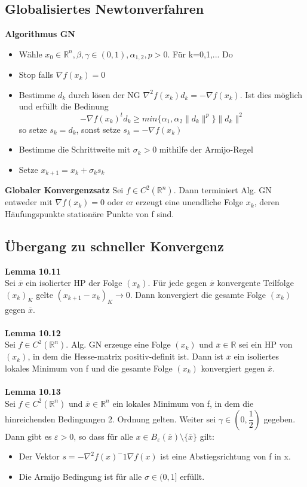 \documentclass[a4paper,10pt]{article}
\begin{document}
\subsection{Globalisiertes Newtonverfahren}
\textbf{Algorithmus GN}\\
\begin{itemize}
\item Wähle $x_0\in \mathbb{R}^n,\beta,\gamma \in (0,1), \alpha_{1,2},p>0$.  Für k=0,1,... Do
\item Stop falls $\nabla f(x_k)=0$
\item Bestimme $d_k$ durch lösen der NG $\nabla ^2f(x_k)d_k=-\nabla f(x_k)$. Ist dies möglich und erfüllt die Bedinung \begin{equation}
-\nabla f(x_k)^td_k\geq min\{\alpha_1,\alpha_2\|d_k\|^p\}\|d_k\|^2
\end{equation}
so setze $s_k=d_k$, sonst setze $s_k=-\nabla f(x_k)$
\item Bestimme die Schrittweite mit $\sigma_k>0$ mithilfe der Armijo-Regel
\item Setze $x_{k+1}=x_k+\sigma_k s_k$
\end{itemize}

\textbf{Globaler Konvergenzsatz}
Sei $f\in C^2(\mathbb{R}^n)$. Dann terminiert Alg. GN entweder mit $\nabla f(x_k)=0$ oder er erzeugt eine unendliche Folge $x_k$, deren Häufungspunkte stationäre Punkte von f sind.

\subsection{Übergang zu schneller Konvergenz}
\textbf{Lemma 10.11}\\
Sei $\overline{x}$ ein isolierter HP der Folge $(x_k)$. Für jede gegen $\overline{x}$ konvergente Teilfolge $(x_k)_K$ gelte $(x_{k+1}-x_k)_K\rightarrow 0$. Dann konvergiert die gesamte Folge $(x_k)$ gegen $\overline{x}$.\\
\\
\textbf{Lemma 10.12}\\
Sei $f\in C^2(\mathbb{R}^n)$. Alg. GN erzeuge eine Folge $(x_k)$ und $\overline{x}\in \mathbb{R}$ sei ein HP von $(x_k)$, in dem die Hesse-matrix positiv-definit ist. Dann ist $\overline{x}$ ein isoliertes lokales Minimum von f und die gesamte Folge $(x_k)$ konvergiert gegen $\overline{x}$.
\\
\\
\textbf{Lemma 10.13}\\
Sei $f\in C^2(\mathbb{R}^n)$ und $\overline{x}\in \mathbb{R}^n$ ein lokales Minimum von f, in dem die hinreichenden Bedingungen 2. Ordnung gelten. Weiter sei $\gamma\in (0,\dfrac{1}{2})$ gegeben. Dann gibt es $\varepsilon>0$, so dass für alle $x\in B_{\varepsilon}(\overline{x})\setminus \{\overline{x}\}$ gilt:
\begin{itemize}
\item Der Vektor $s=-\nabla^2 f(x)^-1\nabla f(x)$ ist eine Abstiegsrichtung von f in x.
\item Die Armijo Bedingung ist für alle $\sigma\in (0,1]$ erfüllt.
\end{itemize}
\end{document}
